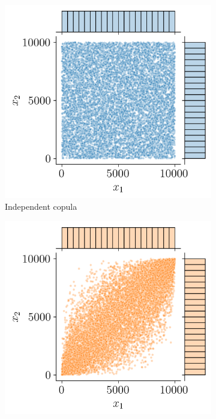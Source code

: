 \begin{figure}
    \centering
    \begin{subfigure}[b]{0.32\textwidth}
        \centering
        \includegraphics[width=\textwidth]{../numerical_experiments/chapter1/figures/independent_copula_ranked.png}
        \caption{Independent copula}
    \end{subfigure}
    \hfill
    \begin{subfigure}[b]{0.32\textwidth}
        \centering
        \includegraphics[width=\textwidth]{../numerical_experiments/chapter1/figures/normal_copula_ranked.png}

\end{subfigure}
\end{figure}
